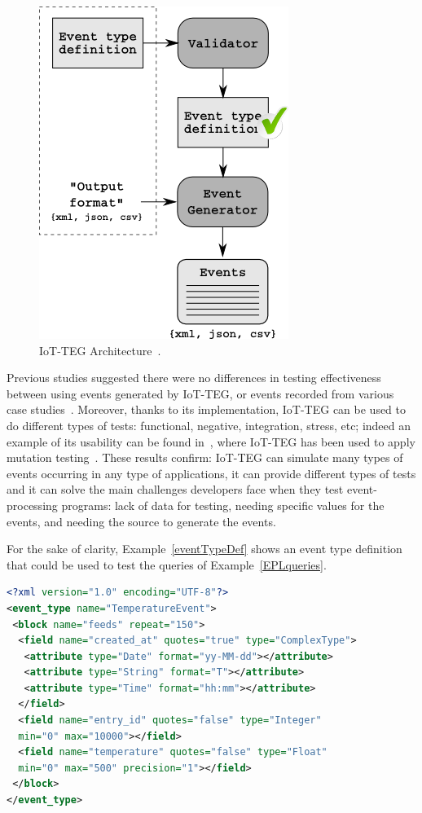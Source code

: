\documentclass[journal]{IEEEtran}
\begin{document}
\begin{figure}[!ht]
  \centering
  \includegraphics[scale=0.5]{./img/IoT-EGArquitecture}
  \caption[IoT-TEG Architecture]{IoT-TEG Architecture~\cite{TesisGutierrez2017,Gutierrez2017}.}
  \label{fig:IoT-EGArquitecture}
\end{figure}

Previous studies suggested there were no differences in testing effectiveness between using events
generated by IoT-TEG, or events recorded from various case studies~\cite{TesisGutierrez2017,Gutierrez2017}.
Moreover, thanks to its implementation, IoT-TEG can be used to do different types of tests: functional,
negative, integration, stress, etc; indeed an example of its usability can be found 
in~\cite{TesisGutierrez2017,gutierrez2018}, where IoT-TEG has been used to apply mutation 
testing~\cite{jia2011}. These results confirm: IoT-TEG can 
simulate many types of events occurring in any type of applications,
it can provide different types of tests
and it can solve the main challenges developers face when they test event-processing programs: lack of data 
for testing, needing specific values for the events, and needing the source to generate the events.

For the sake of clarity, Example~\ref{eventTypeDef} shows an event type
definition that could be used to test the queries of Example~\ref{EPLqueries}.

\begin{lstlisting}[basicstyle=\ttfamily\scriptsize,language=XML,caption=Event type definition example,label=eventTypeDef]
<?xml version="1.0" encoding="UTF-8"?>
<event_type name="TemperatureEvent">
 <block name="feeds" repeat="150">
  <field name="created_at" quotes="true" type="ComplexType">
   <attribute type="Date" format="yy-MM-dd"></attribute>
   <attribute type="String" format="T"></attribute>
   <attribute type="Time" format="hh:mm"></attribute>
  </field>
  <field name="entry_id" quotes="false" type="Integer" 
  min="0" max="10000"></field>
  <field name="temperature" quotes="false" type="Float" 
  min="0" max="500" precision="1"></field>
 </block>
</event_type>
\end{lstlisting}
\end{document}

